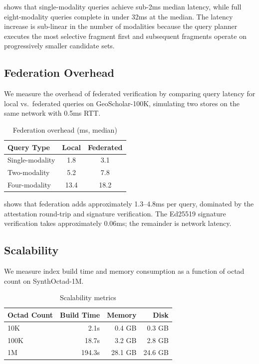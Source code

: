 \documentclass[11pt,twocolumn]{article}
\begin{document}
 shows that single-modality queries achieve sub-2ms
median latency, while full eight-modality queries complete in under 32ms at
the median.  The latency increase is sub-linear in the number of modalities
because the query planner executes the most selective fragment first and
subsequent fragments operate on progressively smaller candidate sets.

\subsection{Federation Overhead}

We measure the overhead of federated verification by comparing query latency
for local vs.\ federated queries on GeoScholar-100K, simulating two stores
on the same network with 0.5ms RTT.

\begin{table}[t]
\centering
\caption{Federation overhead (ms, median)}\label{tab:federation}
\begin{tabular}{@{}lcc@{}}
\toprule
\textbf{Query Type} & \textbf{Local} & \textbf{Federated} \\
\midrule
Single-modality   &  1.8 &   3.1 \\
Two-modality      &  5.2 &   7.8 \\
Four-modality     & 13.4 &  18.2 \\
\bottomrule
\end{tabular}
\end{table}

 shows that federation adds approximately 1.3--4.8ms
per query, dominated by the attestation round-trip and signature verification.
The Ed25519 signature verification takes approximately 0.06ms; the remainder
is network latency.

\subsection{Scalability}

We measure index build time and memory consumption as a function of octad
count on SynthOctad-1M.

\begin{table}[t]
\centering
\caption{Scalability metrics}\label{tab:scalability}
\begin{tabular}{@{}lrrr@{}}
\toprule
\textbf{Octad Count} & \textbf{Build Time} & \textbf{Memory} & \textbf{Disk} \\
\midrule
10K     &   2.1s &  0.4 GB &  0.3 GB \\
100K    &  18.7s &  3.2 GB &  2.8 GB \\
1M      & 194.3s & 28.1 GB & 24.6 GB \\
\bottomrule
\end{tabular}
\end{table}
\end{document}
